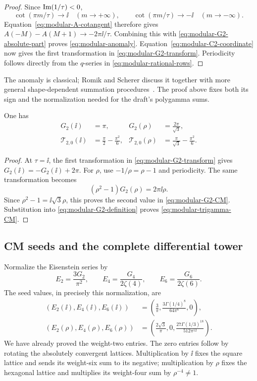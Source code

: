 \begin{proof}
Since \(\operatorname{Im}(1/\tau)<0\),
\[
\cot(\pi m/\tau)\longrightarrow\ii\quad(m\to+\infty),
\qquad
\cot(\pi m/\tau)\longrightarrow-\ii\quad(m\to-\infty).
\]
Equation~\eqref{eq:modular-A-cotangent} therefore gives
\(A(-M)-A(M+1)\to-2\pi\ii/\tau\). Combining this with
\eqref{eq:modular-G2-absolute-part} proves
\eqref{eq:modular-anomaly}. Equation~\eqref{eq:modular-C2-coordinate}
now gives the first transformation in
\eqref{eq:modular-G2-transform}. Periodicity follows directly from
the \(q\)-series in \eqref{eq:modular-rational-rows}.
\end{proof}

The anomaly is classical; Romik and Scherer discuss it together with
more general shape-dependent summation procedures~\cite{RomikScherer}.
The proof above fixes both its sign and the normalization needed for
the draft's polygamma sums.

\begin{corollary}
\label{cor:modular-weight-two-CM}
One has
\begin{align}
G_2(\ii)&=\pi,&G_2(\rho)&=\frac{2\pi}{\sqrt3},
\label{eq:modular-G2-CM}\\
\mathcal T_{2,0}(\ii)&=\frac\pi2-\frac{\pi^2}{6},&
\mathcal T_{2,0}(\rho)&=\frac\pi{\sqrt3}-\frac{\pi^2}{6}.
\label{eq:modular-trigamma-CM}
\end{align}
\end{corollary}
\begin{proof}
At \(\tau=\ii\), the first transformation in
\eqref{eq:modular-G2-transform} gives
\(G_2(\ii)=-G_2(\ii)+2\pi\).
For \(\rho\), use \(-1/\rho=\rho-1\) and periodicity. The same
transformation becomes
\[
(\rho^2-1)G_2(\rho)=2\pi\ii\rho.
\]
Since \(\rho^2-1=\ii\sqrt3\rho\), this proves the second value in
\eqref{eq:modular-G2-CM}. Substitution into
\eqref{eq:modular-G2-definition} proves
\eqref{eq:modular-trigamma-CM}.
\end{proof}

\subsection{CM seeds and the complete differential tower}

Normalize the Eisenstein series by
\[
E_2=\frac{3G_2}{\pi^2},\qquad
E_4=\frac{G_4}{2\zeta(4)},\qquad
E_6=\frac{G_6}{2\zeta(6)}.
\]
The seed values, in precisely this normalization, are
\begin{align}
(E_2(\ii),E_4(\ii),E_6(\ii))
&=\left(\frac3\pi,
 \frac{3\Gamma(1/4)^8}{64\pi^6},0\right),
\label{eq:modular-square-seeds}\\
(E_2(\rho),E_4(\rho),E_6(\rho))
&=\left(\frac{2\sqrt3}\pi,0,
 \frac{27\Gamma(1/3)^{18}}{512\pi^{12}}\right).
\label{eq:modular-hex-seeds}
\end{align}
We have already proved the weight-two entries. The zero entries follow
by rotating the absolutely convergent lattices. Multiplication by
\(\ii\) fixes the square lattice and sends its weight-six sum to its
negative; multiplication by \(\rho\) fixes the hexagonal lattice and
multiplies its weight-four sum by \(\rho^{-4}\ne1\).

